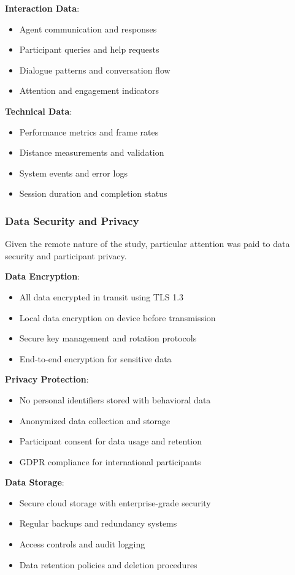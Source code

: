 \documentclass[12pt]{article}
\begin{document}
\textbf{Interaction Data}:
\begin{itemize}
    \item Agent communication and responses
    \item Participant queries and help requests
    \item Dialogue patterns and conversation flow
    \item Attention and engagement indicators
\end{itemize}

\textbf{Technical Data}:
\begin{itemize}
    \item Performance metrics and frame rates
    \item Distance measurements and validation
    \item System events and error logs
    \item Session duration and completion status
\end{itemize}

\subsubsection{Data Security and Privacy}

Given the remote nature of the study, particular attention was paid to data security and participant privacy.

\textbf{Data Encryption}:
\begin{itemize}
    \item All data encrypted in transit using TLS 1.3
    \item Local data encryption on device before transmission
    \item Secure key management and rotation protocols
    \item End-to-end encryption for sensitive data
\end{itemize}

\textbf{Privacy Protection}:
\begin{itemize}
    \item No personal identifiers stored with behavioral data
    \item Anonymized data collection and storage
    \item Participant consent for data usage and retention
    \item GDPR compliance for international participants
\end{itemize}

\textbf{Data Storage}:
\begin{itemize}
    \item Secure cloud storage with enterprise-grade security
    \item Regular backups and redundancy systems
    \item Access controls and audit logging
    \item Data retention policies and deletion procedures
\end{itemize}
\end{document}
